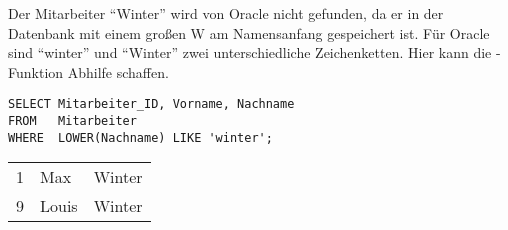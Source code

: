         \begin{center}
          \begin{small}
            \tablehead{}
            \begin{oraclesql}
              \begin{supertabular}{rll}

              \end{supertabular}
            \end{oraclesql}
          \end{small}
        \end{center}
        Der Mitarbeiter \enquote{Winter} wird von Oracle nicht gefunden, da er in der Datenbank mit einem großen W am Namensanfang gespeichert ist. Für Oracle sind \enquote{winter} und \enquote{Winter} zwei unterschiedliche Zeichenketten. Hier kann die -Funktion Abhilfe schaffen.
        \begin{lstlisting}[language=oracle_sql,caption={LOWER - Die Lösung des Problems},label=sql03_03]
SELECT Mitarbeiter_ID, Vorname, Nachname
FROM   Mitarbeiter
WHERE  LOWER(Nachname) LIKE 'winter';
        \end{lstlisting}
\clearpage
        \begin{center}
          \begin{small}
            \tablehead{}
            \begin{oraclesql}
              \begin{supertabular}{rll}
                1 & Max & Winter \\
                9 & Louis & Winter \\
              \end{supertabular}
            \end{oraclesql}
          \end{small}
        \end{center}

